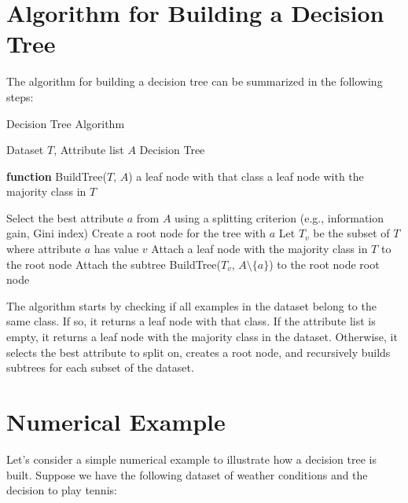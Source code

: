 \documentclass[12pt]{article}
\begin{document}
\section{Algorithm for Building a Decision Tree}
The algorithm for building a decision tree can be summarized in the following steps:

\begin{algorithm}
\caption{Decision Tree Algorithm}
\begin{algorithmic}[1]
\REQUIRE Dataset \( T \), Attribute list \( A \)
\ENSURE Decision Tree

\STATE \textbf{function} BuildTree(\( T \), \( A \))
    \RETURN a leaf node with that class
\ENDIF
{}
    \RETURN a leaf node with the majority class in \( T \)
\ENDIF

\STATE Select the best attribute \( a \) from \( A \) using a splitting criterion (e.g., information gain, Gini index)
\STATE Create a root node for the tree with \( a \)
    \STATE Let \( T_v \) be the subset of \( T \) where attribute \( a \) has value \( v \)
        \STATE Attach a leaf node with the majority class in \( T \) to the root node
    \ELSE
        \STATE Attach the subtree BuildTree(\( T_v \), \( A \setminus \{a\} \)) to the root node
    \ENDIF
\ENDFOR
\RETURN root node
\end{algorithmic}
\end{algorithm}

The algorithm starts by checking if all examples in the dataset belong to the same class. If so, it returns a leaf node with that class. If the attribute list is empty, it returns a leaf node with the majority class in the dataset. Otherwise, it selects the best attribute to split on, creates a root node, and recursively builds subtrees for each subset of the dataset.

\section{Numerical Example}
Let's consider a simple numerical example to illustrate how a decision tree is built. Suppose we have the following dataset of weather conditions and the decision to play tennis:
\end{document}
